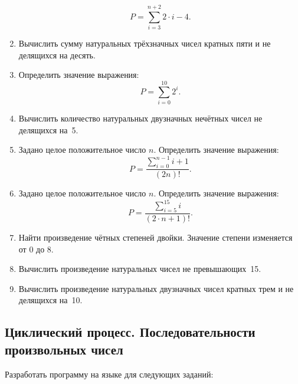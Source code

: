 \begin{enumerate}
 $$P=\sum\limits_{i=3}^{n+2}2\cdot i-4.$$
\item Вычислить сумму натуральных трёхзначных чисел кратных пяти и не делящихся на десять.
\item Определить значение выражения:
 $$P=\sum\limits_{i=0}^{10}2^{i}.$$
\item Вычислить количество натуральных двузначных нечётных чисел не делящихся на~5.
\item Задано целое положительное число $n$. Определить значение выражения:
 $$P=\frac{\sum\limits_{i=0}^{n-1}i+1}{(2n)!}.$$
\item Задано целое положительное число $n$. Определить значение выражения:
 $$P=\frac{\sum\limits_{i=5}^{15}i}{(2\cdot n+1)!}.$$
\item Найти произведение чётных степеней двойки. Значение степени изменяется от 0 до 8.
\item Вычислить произведение натуральных чисел не превышающих~15.
\item Вычислить произведение натуральных двузначных чисел кратных трем и не делящихся на~10.
\end{enumerate}

\subsection[Циклический процесс. Последовательности произвольных чисел]{Циклический процесс. Последовательности
произвольных чисел}
Разработать программу на языке  для следующих заданий:

